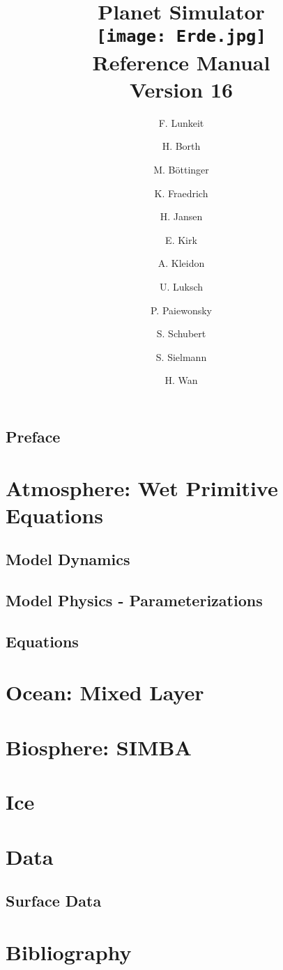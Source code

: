 \documentclass[12pt,twoside,a4paper]{book}
\title { {\Huge\bf Planet Simulator } \\
\vspace*{1cm}
\texttt{[image: Erde.jpg]} \\
\vspace*{1cm}
   {\huge \bf Reference Manual } \\
\vspace*{1cm}
   {\huge \bf Version 16} \\
   }
\author{F. Lunkeit
   \and H. Borth
   \and M. B\"ottinger
   \and K. Fraedrich
   \and H. Jansen
   \and E. Kirk
   \and A. Kleidon
   \and U. Luksch
   \and P. Paiewonsky
   \and S. Schubert
   \and S. Sielmann
   \and H. Wan
 }
\begin{document}
\maketitle   

\tableofcontents

\chapter{Preface}


\part{Atmosphere: Wet Primitive Equations}

\chapter{Model Dynamics}


\chapter{Model Physics - Parameterizations}


\chapter{Equations}


\part{Ocean: Mixed Layer}


\part{Biosphere: SIMBA}


\part{Ice}


\part{Data}

\chapter{Surface Data}


%

\part{Bibliography}
%
%


\end{document}
